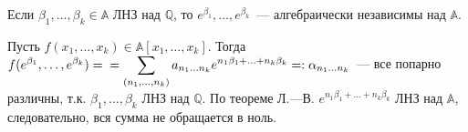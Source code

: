 \begin{corollary} \label{l14_cor5}
	Если $\beta_1,\dots,\beta_k \in \mathbb{A}$ ЛНЗ над $\mathbb{Q}$, то $e^{\beta_1},\dots,e^{\beta_k}$ — алгебраически независимы над $\mathbb{A}$.
\end{corollary}
\begin{pf}
	Пусть $f(x_1,\dots,x_k) \in \mathbb{A}[x_1,\dots,x_k]$. Тогда $\displaystyle f(e^{\beta_1},\dots,e^{\beta_k}) = \\ = \sum\limits_{(n_1,\dots,n_k)} a_{n_1\dots n_k}e^{n_1\beta_1+...+n_k\beta_k} =: \alpha_{n_1\dots n_k}$ — все попарно различны, т.к.
	$\beta_1,\dots,\beta_k$ ЛНЗ над $\mathbb{Q}$. По теореме Л.—В.
	$e^{n_1\beta_1+...+n_k\beta_k}$ ЛНЗ над $\mathbb{A}$, следовательно, вся сумма не обращается в ноль.
\end{pf}